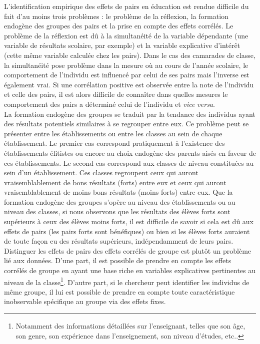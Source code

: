 \documentclass[
]{book}
\begin{document}
\quad L'identification empirique des effets de pairs en éducation est rendue difficile du fait d'au moins trois problèmes : le problème de la réflexion, la formation endogène des groupes des pairs et la prise en compte des effets corrélés. Le problème de la réflexion est dû à la simultanéité de la variable dépendante (une variable de résultats scolaire, par exemple) et la variable explicative d'intérêt (cette même variable calculée chez les pairs). Dans le cas des camarades de classe, la simultanéité pose problème dans la mesure où au cours de l'année scolaire, le comportement de l'individu est influencé par celui de ses pairs mais l'inverse est également vrai. Si une corrélation positive est observée entre la note de l'individu et celle des pairs, il est alors difficile de connaître dans quelles mesures le comportement des pairs a déterminé celui de l'individu et \emph{vice versa}.\\
La formation endogène des groupes se traduit par la tendance des individus ayant des résultats potentiels similaires à se regrouper entre eux. Ce problème peut se présenter entre les établissements ou entre les classes au sein de chaque établissement. Le premier cas correspond pratiquement à l'existence des établissements élitistes ou encore au choix endogène des parents aisés en faveur de ces établissements. Le second cas correspond aux classes de niveau constituées au sein d'un établissement. Ces classes regroupent ceux qui auront vraisemblablement de bons résultats (forts) entre eux et ceux qui auront vraisemblablement de moins bons résultats (moins forts) entre eux. Que la formation endogène des groupes s'opère au niveau des établissements ou au niveau des classes, si nous observons que les résultats des élèves forts sont supérieurs à ceux des élèves moins forts, il est difficile de savoir si cela est dû aux effets de pairs (les pairs forts sont bénéfiques) ou bien si les élèves forts auraient de toute façon eu des résultats supérieurs, indépendamment de leurs pairs.\\
Distinguer les effets de pairs des effets corrélés de groupe est plutôt un problème lié aux données. D'une part, il est possible de prendre en compte les effets corrélés de groupe en ayant une base riche en variables explicatives pertinentes au niveau de la classe\footnote{Notamment des informations détaillées sur l'enseignant, telles que son âge, son genre, son expérience dans l'enseignement, son niveau d'études, etc..}. D'autre part, si le chercheur peut identifier les individus de même groupe, il lui est possible de prendre en compte toute caractéristique inobservable spécifique au groupe via des effets fixes.
\end{document}
